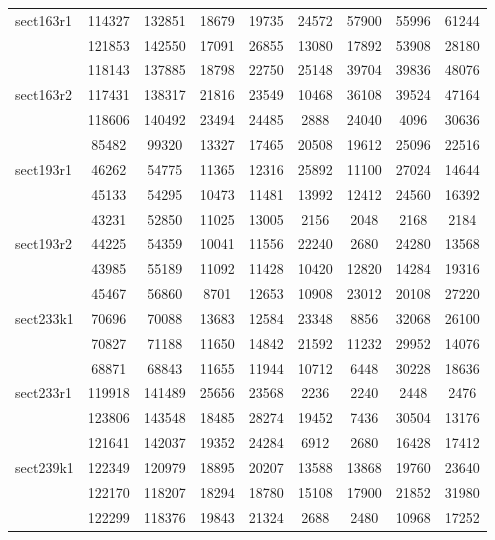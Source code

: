 \documentclass[a4paper]{article}
\begin{document}
\begin{center}
\begin{longtable}{ |l|c|c|c|c|c|c|c|c| }
sect163r1 & 114327 & 132851 & 18679 & 19735 & 24572 & 57900 & 55996 & 61244 \\ 
& 121853 & 142550 & 17091 & 26855 & 13080 & 17892 & 53908 & 28180 \\
& 118143 & 137885 & 18798 & 22750 & 25148 & 39704 & 39836 & 48076 \\ \hline

sect163r2 & 117431 & 138317 & 21816 & 23549 & 10468 & 36108 & 39524 & 47164 \\ 
& 118606 & 140492 & 23494 & 24485 & 2888 & 24040 & 4096 & 30636 \\ 
& 85482 & 99320 & 13327 & 17465 & 20508 & 19612 & 25096 & 22516 \\ \hline

sect193r1 & 46262 & 54775 & 11365 & 12316 & 25892 & 11100 & 27024 & 14644 \\
& 45133 & 54295 & 10473 & 11481 & 13992 & 12412 & 24560 & 16392 \\ 
& 43231 & 52850 & 11025 & 13005 & 2156 & 2048 & 2168 & 2184 \\ \hline

sect193r2 & 44225 & 54359 & 10041 & 11556 & 22240 & 2680 & 24280 & 13568 \\
& 43985 & 55189 & 11092 & 11428 & 10420 & 12820 & 14284 & 19316 \\ 
& 45467 & 56860 & 8701 & 12653 & 10908 & 23012 & 20108 & 27220 \\ \hline

sect233k1 & 70696 & 70088 & 13683 & 12584 & 23348 & 8856 & 32068 & 26100 \\ 
& 70827 & 71188 & 11650 & 14842 & 21592 & 11232 & 29952 & 14076 \\
& 68871 & 68843 & 11655 & 11944 & 10712 & 6448 & 30228 & 18636 \\ \hline

sect233r1 & 119918 & 141489 & 25656 & 23568 & 2236 & 2240 & 2448 & 2476 \\ 
& 123806 & 143548 & 18485 & 28274 & 19452 & 7436 & 30504 & 13176 \\
& 121641 & 142037 & 19352 & 24284 & 6912 & 2680 & 16428 & 17412 \\ \hline

sect239k1 & 122349 & 120979 & 18895 & 20207 & 13588 & 13868 & 19760 & 23640 \\ 
& 122170 & 118207 & 18294 & 18780 & 15108 & 17900 & 21852 & 31980 \\
& 122299 & 118376 & 19843 & 21324 & 2688 & 2480 & 10968 & 17252 \\ \hline


\end{longtable}
\end{center}
\end{document}
